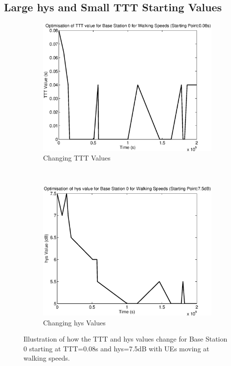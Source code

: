 \subsection{Large hys and Small TTT Starting Values}\label{ap:walk_highhys}
\begin{figure}[H]
        \centering
        \begin{subfigure}[b]{0.49\textwidth}
                \includegraphics[width=\textwidth]{figures/graphs/walkhighhys/TTT0.eps}
                \caption{Changing TTT Values}
        \end{subfigure}%
        ~ %
        \begin{subfigure}[b]{0.49\textwidth}
                \includegraphics[width=\textwidth]{figures/graphs/walkhighhys/hys0.eps}
                \caption{Changing hys Values}
        \end{subfigure}
        \caption{Illustration of how the TTT and hys values change for Base Station 0 starting at TTT=0.08s and hys=7.5dB with UEs moving at walking speeds.}
\end{figure}
